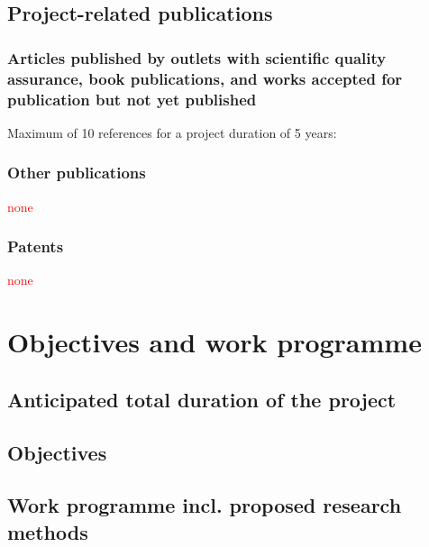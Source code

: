 \documentclass[a4paper,11pt,numbers=noenddot,parskip=half-]{scrreprt}
\begin{document}
\subsection{Project-related publications}

\subsubsection{Articles published by outlets with scientific quality assurance, book publications, and works accepted for publication but not yet published}
Maximum of 10 references for a project duration of 5 years:\\
\begin{enumerate}[leftmargin=1.5em,topsep=0pt,itemsep=0.0ex,partopsep=0ex,parsep=0.0ex]
	
\end{enumerate}

\subsubsection{Other publications}
\textcolor{red}{none}

\subsubsection{Patents}
\textcolor{red}{none}

\section{Objectives and work programme}\label{sec:work_prog}
\subsection{Anticipated total duration of the project}
\myblindtext

\subsection{Objectives}\label{sec:work_prog:objectives}
\myblindtext


\subsection{Work programme incl. proposed research methods}
\myblindtext[2]
\end{document}
